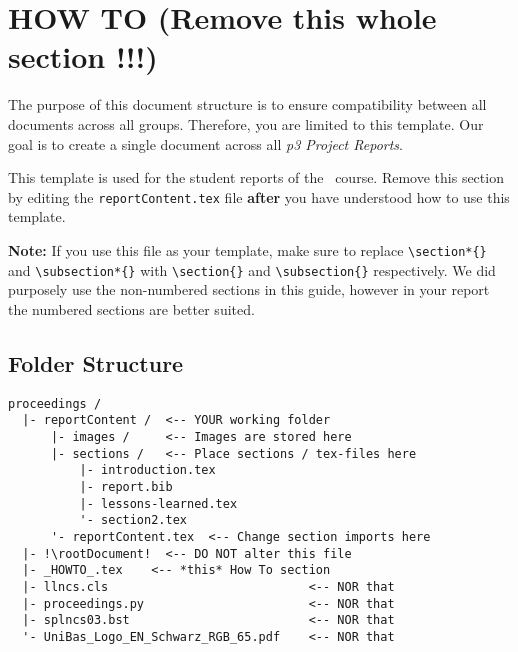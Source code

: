 \section*{HOW TO (Remove this whole section !!!)}
\label{sec:usage}

The purpose of this document structure is to ensure compatibility between all documents across all groups. Therefore, you are limited to this template. Our goal is to create a single document across all \textit{p3 Project Reports}.

\medskip
This template is used for the student reports of the \coursename\ course. Remove this section by editing the \texttt{reportContent.tex} file \textbf{after} you have understood how to use this template.

\medskip
\textbf{Note:} If you use this file as your template, make sure to replace \verb|\section*{}| and \verb|\subsection*{}| with \verb|\section{}| and \verb|\subsection{}| respectively. We did purposely use the non-numbered sections in this guide, however in your report the numbered sections are better suited.

\subsection*{Folder Structure}
\begin{lstlisting}[escapechar=!,basicstyle=\footnotesize]
proceedings /
  |- reportContent /  <-- YOUR working folder
      |- images /     <-- Images are stored here
      |- sections /   <-- Place sections / tex-files here
          |- introduction.tex
          |- report.bib
          |- lessons-learned.tex
          '- section2.tex
      '- reportContent.tex  <-- Change section imports here
  |- !\rootDocument!  <-- DO NOT alter this file
  |- _HOWTO_.tex    <-- *this* How To section
  |- llncs.cls                            <-- NOR that
  |- proceedings.py                       <-- NOR that
  |- splncs03.bst                         <-- NOR that
  '- UniBas_Logo_EN_Schwarz_RGB_65.pdf    <-- NOR that
\end{lstlisting}


